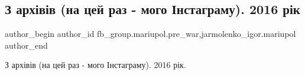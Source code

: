  
 
 
 
 

\subsection{З архівів (на цей раз - мого Інстаграму). 2016 рік}
\label{sec:04_02_2023.fb.fb_group.mariupol.pre_war.3.z_arkh_v_v__na_tsei_}
 
\ifcmt
 author_begin
   author_id fb_group.mariupol.pre_war,jarmolenko_igor.mariupol
 author_end
\fi

З архівів (на цей раз - мого Інстаграму). 2016 рік.

